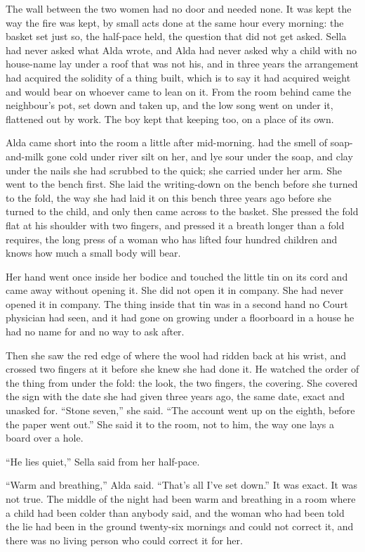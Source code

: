 The wall between the two women had no door and needed none. It was kept the way the fire was kept, by small acts done at the same hour every morning: the basket set just so, the half-pace held, the question that did not get asked. Sella had never asked what Alda wrote, and Alda had never asked why a child with no house-name lay under a roof that was not his, and in three years the arrangement had acquired the solidity of a thing built, which is to say it had acquired weight and would bear on whoever came to lean on it. From the room behind came the neighbour's pot, set down and taken up, and the low song went on under it, flattened out by work. The boy kept that keeping too, on a place of its own.

Alda came short into the room a little after mid-morning.  had the smell of soap-and-milk gone cold under river silt on her, and lye sour under the soap, and clay under the nails she had scrubbed to the quick; she carried  under her arm. She went to the bench first. She laid the writing-down on the bench before she turned to the fold, the way she had laid it on this bench three years ago before she turned to the child, and only then came across to the basket. She pressed the fold flat at his shoulder with two fingers, and pressed it a breath longer than a fold requires, the long press of a woman who has lifted four hundred children and knows how much a small body will bear.

Her hand went once inside her bodice and touched the little tin on its cord and came away without opening it. She did not open it in company. She had never opened it in company. The thing inside that tin was in a second hand no Court physician had seen, and it had gone on growing under a floorboard in a house he had no name for and no way to ask after.

Then she saw the red edge of  where the wool had ridden back at his wrist, and crossed two fingers at it before she knew she had done it. He watched the order of the thing from under the fold: the look, the two fingers, the covering. She covered the sign with the date she had given  three years ago, the same date, exact and unasked for. “Stone seven,” she said. “The account went up on the eighth, before the paper went out.” She said it to the room, not to him, the way one lays a board over a hole.

“He lies quiet,” Sella said from her half-pace.

“Warm and breathing,” Alda said. “That's all I've set down.” It was exact. It was not true. The middle of the night had been warm and breathing in a room where a child had been colder than anybody said, and the woman who had been told the lie had been in the ground twenty-six mornings and could not correct it, and there was no living person who could correct it for her.

